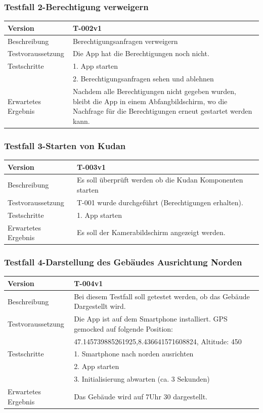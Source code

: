 \documentclass[a4paper]{scrreprt}
\begin{document}
\subsubsection{Testfall 2-Berechtigung verweigern}
\begin{tabularx}{\textwidth}{|l|X|}
\hline 
	Version &
	T-002v1 \\ 
\hline 
	Beschreibung & Berechtigungsanfragen verweigern \\ 
\hline 
	Testvoraussetzung & Die App hat die Berechtigungen noch nicht. \\ 
\hline 
	Testschritte &
		1. App starten \\ &
		2. Berechtigungsanfragen sehen und ablehnen \\
\hline
	Erwartetes Ergebnis & Nachdem alle Berechtigungen nicht gegeben wurden, bleibt die App in einem Abfangbildschirm, wo die Nachfrage für die Berechtigungen erneut gestartet werden kann. \\ 
\hline 
\end{tabularx}
\subsubsection{Testfall 3-Starten von Kudan}
\begin{tabularx}{\textwidth}{|l|X|}
\hline 
	Version &
	T-003v1 \\ 
\hline 
	Beschreibung & 
	Es soll überprüft werden ob die Kudan Komponenten starten\\ 
\hline 
	Testvoraussetzung &
	T-001 wurde durchgeführt (Berechtigungen erhalten). \\ 
\hline 
	Testschritte &
		1. App starten \\
\hline
	Erwartetes Ergebnis &
	Es soll der Kamerabildschirm angezeigt werden. \\ 
\hline 
\end{tabularx}
\subsubsection{Testfall 4-Darstellung des Gebäudes Ausrichtung Norden}
\begin{tabularx}{\textwidth}{|l|X|}
\hline 
	Version &
	T-004v1 \\ 
\hline 
	Beschreibung & 
	Bei diesem Testfall soll getestet werden, ob das Gebäude Dargestellt wird.\\ 
\hline 
	Testvoraussetzung &
	Die App ist auf dem Smartphone installiert. GPS gemocked auf folgende Position: \\ & 
		47.145739885261925,8.436641571608824, Altitude: 450 \\ 
\hline 
	Testschritte & 
		1. Smartphone nach norden ausrichten \\ &
		2. App starten \\ &
		3. Initialisierung abwarten (ca. 3 Sekunden)\\
\hline
	Erwartetes Ergebnis &
	Das Gebäude wird auf 7Uhr 30 dargestellt. \\ 
\hline 
\end{tabularx}
\end{document}
